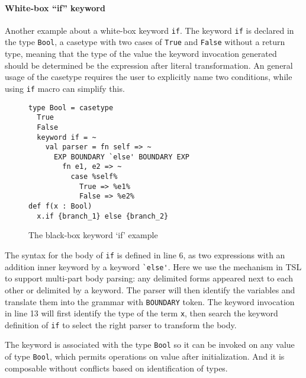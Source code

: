 \documentclass{sig-alternate}
\begin{document}
\paragraph{White-box ``if'' keyword}
Another example about a white-box keyword \verb|if|. The keyword \verb|if| is declared in the type \verb|Bool|, a casetype with two cases of \verb|True| and \verb|False| without a return type, meaning that the type of the value the keyword invocation generated should be determined be the expression after literal transformation. An general usage of the casetype requires the user to explicitly name two conditions, while using \verb|if| macro can simplify this.
\begin{figure}[ht]
\begin{lstlisting}[style=wyvern]
type Bool = casetype 
  True
  False
  keyword if = ~
    val parser = fn self => ~
      EXP BOUNDARY `else' BOUNDARY EXP
        fn e1, e2 => ~
          case %self%
            True => %e1%
            False => %e2%
def f(x : Bool)
  x.if {branch_1} else {branch_2}
\end{lstlisting}
\vspace{-8px}
\caption{The black-box keyword `if' example}
\vspace{-10px}
\label{if-example}
\end{figure}

The syntax for the body of \verb|if| is defined in line 6, as two expressions with an addition inner keyword by a keyword \verb|`else'|. Here we use the mechanism in TSL to support multi-part body parsing: any delimited forms appeared next to each other or delimited by a keyword. The parser will then identify the variables and translate them into the grammar with \verb|BOUNDARY| token. The keyword invocation in line 13 will first identify the type of the term \verb|x|, then search the keyword definition of \verb|if| to select the right parser to transform the body. 

The keyword is associated with the type \verb|Bool| so it can be invoked on any value of type \verb|Bool|, which permits operations on value after initialization. And it is composable without conflicts based on identification of types. 
\end{document}
